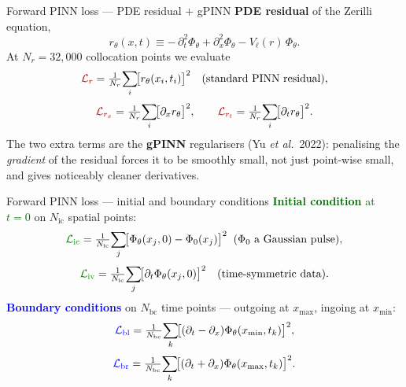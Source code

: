 \documentclass[aspectratio=169, 11pt]{beamer}
\newcommand{\zer}{Zerilli}
\begin{document}
\begin{frame}{Forward PINN loss --- PDE residual $+$ gPINN}
  \footnotesize
  \textbf{PDE residual} of the \zer{} equation,
  \[
    r_{\theta}(x,t) \equiv
    -\,\partial_{t}^{2}\Phi_{\theta}
    + \partial_{x}^{2}\Phi_{\theta}
    - V_{\ell}(r)\,\Phi_{\theta}.
  \]
  At $N_{r}=32{,}000$ collocation points we evaluate
  \[
    \textcolor{darkred}{\mathcal{L}_{r}}
      = \tfrac{1}{N_{r}}\!\sum_{i}\!\bigl[r_{\theta}(x_{i},t_{i})\bigr]^{2}
    \quad\text{(standard PINN residual),}
  \]
  \[
    \textcolor{darkred}{\mathcal{L}_{r_{x}}}
      = \tfrac{1}{N_{r}}\!\sum_{i}\!\bigl[\partial_{x} r_{\theta}\bigr]^{2},
    \qquad
    \textcolor{darkred}{\mathcal{L}_{r_{t}}}
      = \tfrac{1}{N_{r}}\!\sum_{i}\!\bigl[\partial_{t} r_{\theta}\bigr]^{2}.
  \]
  \medskip
  The two extra terms are the \textbf{gPINN} regularisers (Yu \emph{et al.}\ 2022):
  penalising the \emph{gradient} of the residual forces it to be smoothly small,
  not just point-wise small, and gives noticeably cleaner derivatives.
\end{frame}

\begin{frame}{Forward PINN loss --- initial and boundary conditions}
  \footnotesize
  \textcolor{darkgreen}{\textbf{Initial condition} at $t=0$} on $N_{\mathrm{ic}}$ spatial points:
  \[
    \textcolor{darkgreen}{\mathcal{L}_{\mathrm{ic}}}
      = \tfrac{1}{N_{\mathrm{ic}}}\!\sum_{j}\!\bigl[\Phi_{\theta}(x_{j},0)-\Phi_{0}(x_{j})\bigr]^{2}
    \;\;(\Phi_{0}\text{ a Gaussian pulse}),
  \]
  \[
    \textcolor{darkgreen}{\mathcal{L}_{\mathrm{iv}}}
      = \tfrac{1}{N_{\mathrm{ic}}}\!\sum_{j}\!\bigl[\partial_{t}\Phi_{\theta}(x_{j},0)\bigr]^{2}
    \quad\text{(time-symmetric data)}.
  \]
  \medskip
  \textcolor{blue}{\textbf{Boundary conditions}} on $N_{\mathrm{bc}}$ time points ---
  outgoing at $x_{\max}$, ingoing at $x_{\min}$:
  \[
    \textcolor{blue}{\mathcal{L}_{\mathrm{bl}}}
      = \tfrac{1}{N_{\mathrm{bc}}}\!\sum_{k}\!\bigl[(\partial_{t}-\partial_{x})\Phi_{\theta}(x_{\min},t_{k})\bigr]^{2},
  \]
  \[
    \textcolor{blue}{\mathcal{L}_{\mathrm{br}}}
      = \tfrac{1}{N_{\mathrm{bc}}}\!\sum_{k}\!\bigl[(\partial_{t}+\partial_{x})\Phi_{\theta}(x_{\max},t_{k})\bigr]^{2}.
  \]
\end{frame}
\end{document}
